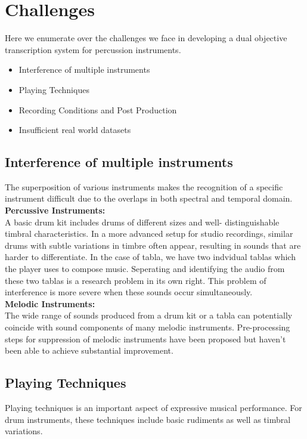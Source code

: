 \chapter{Challenges}

Here we enumerate over the challenges we face in developing a dual objective transcription system for percussion instruments. 

\begin{itemize}
\item Interference of multiple instruments
\item Playing Techniques
\item Recording Conditions and Post Production
\item Insufficient real world datasets
\end{itemize}

\section{Interference of multiple instruments}
The superposition of various instruments makes the recognition of a specific instrument difficult due to the overlaps in both spectral and temporal domain. \\ 
\textbf{Percussive Instruments:} \\ 
A basic drum kit includes drums of different sizes and well- distinguishable timbral characteristics. In a more advanced setup for studio recordings, similar drums with subtle variations in timbre often appear, resulting in sounds that are harder to differentiate. In the case of tabla, we have two indvidual tablas which the player uses to compose music. Seperating and identifying the audio from these two tablas is a research problem in its own right. This problem of interference is more severe when these sounds occur simultaneously. \\ 
\textbf{Melodic Instruments:} \\ 
The wide range of sounds produced from a drum kit or a tabla can potentially coincide with sound components of many melodic instruments. Pre-processing steps for suppression of melodic instruments have been proposed but haven’t been able to achieve substantial improvement. 

\section{Playing Techniques}
Playing techniques is an important aspect of expressive musical performance. For drum instruments, these techniques include basic rudiments as well as timbral variations. 

